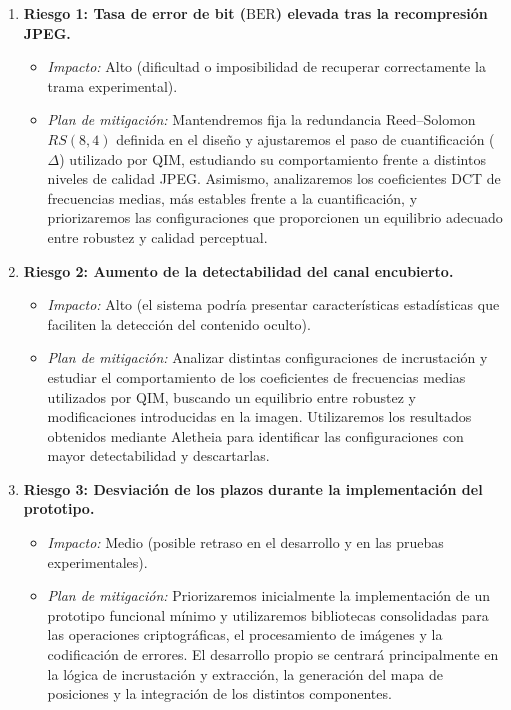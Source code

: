 \documentclass[IB]{TFUOC}%
\begin{document}
\begin{enumerate}

\item \textbf{Riesgo 1: Tasa de error de bit ($\mathrm{BER}$) elevada tras la recompresión JPEG.}
\begin{itemize}
    \item \textit{Impacto:} Alto (dificultad o imposibilidad de recuperar correctamente la trama experimental).
    \item \textit{Plan de mitigación:} Mantendremos fija la redundancia Reed--Solomon $RS(8,4)$ definida en el diseño y ajustaremos el paso de cuantificación ($\Delta$) utilizado por QIM, estudiando su comportamiento frente a distintos niveles de calidad JPEG. Asimismo, analizaremos los coeficientes DCT de frecuencias medias, más estables frente a la cuantificación, y priorizaremos las configuraciones que proporcionen un equilibrio adecuado entre robustez y calidad perceptual.
\end{itemize}

\item \textbf{Riesgo 2: Aumento de la detectabilidad del canal encubierto.}
\begin{itemize}
    \item \textit{Impacto:} Alto (el sistema podría presentar características estadísticas que faciliten la detección del contenido oculto).
    \item \textit{Plan de mitigación:} Analizar distintas configuraciones de incrustación y estudiar el comportamiento de los coeficientes de frecuencias medias utilizados por QIM, buscando un equilibrio entre robustez y modificaciones introducidas en la imagen. Utilizaremos los resultados obtenidos mediante Aletheia para identificar las configuraciones con mayor detectabilidad y descartarlas.
\end{itemize}

\item \textbf{Riesgo 3: Desviación de los plazos durante la implementación del prototipo.}
\begin{itemize}
    \item \textit{Impacto:} Medio (posible retraso en el desarrollo y en las pruebas experimentales).
    \item \textit{Plan de mitigación:} Priorizaremos inicialmente la implementación de un prototipo funcional mínimo y utilizaremos bibliotecas consolidadas para las operaciones criptográficas, el procesamiento de imágenes y la codificación de errores. El desarrollo propio se centrará principalmente en la lógica de incrustación y extracción, la generación del mapa de posiciones y la integración de los distintos componentes.
\end{itemize}


\end{enumerate}
\end{document}
